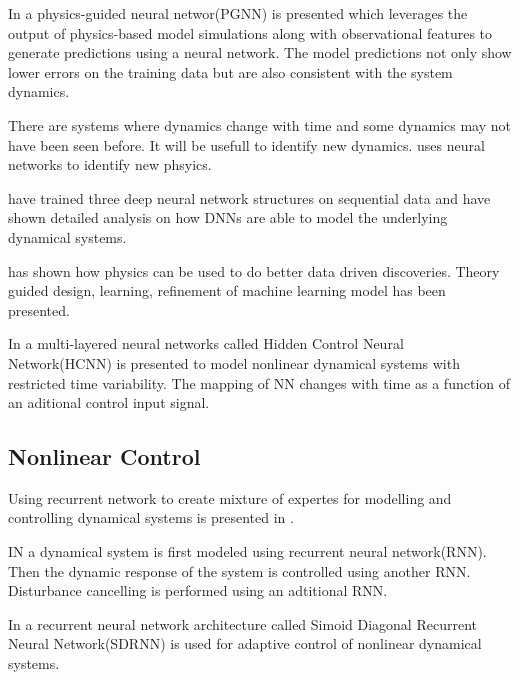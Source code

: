 \documentclass[conference]{IEEEtran}
\begin{document}
In \cite{karpatne2017nips, karpatne2017physics-guided} a physics-guided neural networ(PGNN) is presented which leverages the output of physics-based model simulations along with observational features to generate predictions using a neural network. The model predictions not only show lower errors on the training data but are also consistent with the system dynamics.

There are systems where dynamics change with time and some dynamics may not have been seen before. It will be usefull to identify new dynamics. \cite{d'agnolo2018learning} uses neural networks to identify new phsyics.

\cite{ogunmolu2016nonlinear} have trained three deep neural network structures on sequential data and have shown detailed analysis on how DNNs are able to model the underlying dynamical systems.

\cite{karpatne2017theory-guided} has shown how physics can be used to do better data driven discoveries. Theory guided design, learning, refinement of machine learning model has been presented.

In \cite{levin1991nips} a multi-layered neural networks called Hidden Control Neural Network(HCNN) is presented to model nonlinear dynamical systems with restricted time variability. The mapping of NN changes with time as a function of an aditional control input signal.


\subsection{Nonlinear Control}

\cite{timothy1994nips, plett2003nn, aboueldahab2011identification, milito1991nips, lippmann1991nips, scott1992nips, HBZnips96, takashi2005nonlinear, sabino1999chaos, schnider1997nips, doya1997nips, rawlik2010nips, watter2015nips, Mozer1996TheNP, chen2002ICDC, yu1996nips}

Using recurrent network to create mixture of expertes for modelling and controlling dynamical systems is presented in \cite{timothy1994nips}.

IN \cite{plett2003nn} a dynamical system is first modeled using recurrent neural network(RNN). Then the dynamic response of the system is controlled using another RNN. Disturbance cancelling is performed using an adtitional RNN.

In \cite{aboueldahab2011identification} a recurrent neural network architecture called Simoid Diagonal Recurrent Neural Network(SDRNN) is used for adaptive control of nonlinear dynamical systems.
\end{document}
